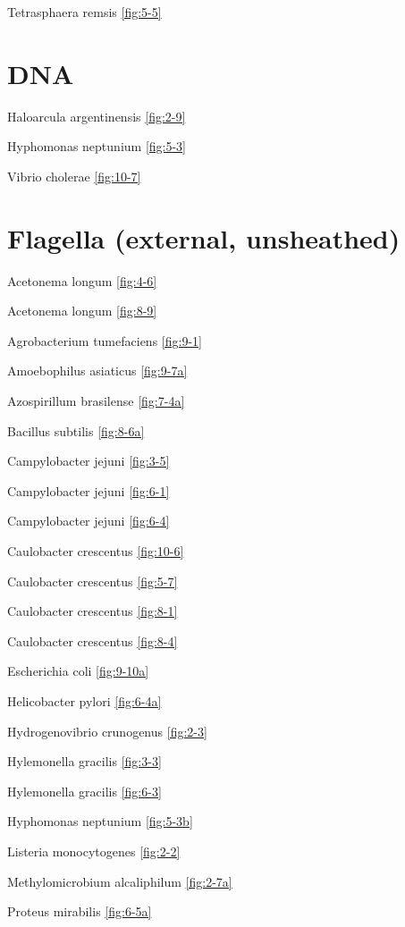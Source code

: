 \documentclass[]{tufte-book}
\begin{document}
Tetrasphaera remsis \ref{fig:5-5}

\section*{DNA}\label{dna}

Haloarcula argentinensis \ref{fig:2-9}

Hyphomonas neptunium \ref{fig:5-3}

Vibrio cholerae \ref{fig:10-7}

\section*{Flagella (external,
unsheathed)}\label{flagella-external-unsheathed}

Acetonema longum \ref{fig:4-6}

Acetonema longum \ref{fig:8-9}

Agrobacterium tumefaciens \ref{fig:9-1}

Amoebophilus asiaticus \ref{fig:9-7a}

Azospirillum brasilense \ref{fig:7-4a}

Bacillus subtilis \ref{fig:8-6a}

Campylobacter jejuni \ref{fig:3-5}

Campylobacter jejuni \ref{fig:6-1}

Campylobacter jejuni \ref{fig:6-4}

Caulobacter crescentus \ref{fig:10-6}

Caulobacter crescentus \ref{fig:5-7}

Caulobacter crescentus \ref{fig:8-1}

Caulobacter crescentus \ref{fig:8-4}

Escherichia coli \ref{fig:9-10a}

Helicobacter pylori \ref{fig:6-4a}

Hydrogenovibrio crunogenus \ref{fig:2-3}

Hylemonella gracilis \ref{fig:3-3}

Hylemonella gracilis \ref{fig:6-3}

Hyphomonas neptunium \ref{fig:5-3b}

Listeria monocytogenes \ref{fig:2-2}

Methylomicrobium alcaliphilum \ref{fig:2-7a}

Proteus mirabilis \ref{fig:6-5a}
\end{document}
